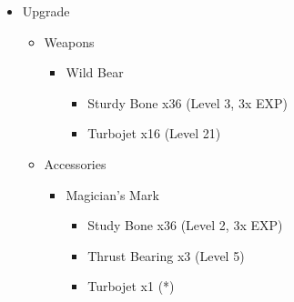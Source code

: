 \begin{upgrade}
\begin{itemize}
    \item Upgrade
    \begin{itemize}
        \item Weapons
        \begin{itemize}
            \item Wild Bear
            \begin{itemize}
                \item Sturdy Bone x36 (Level 3, 3x EXP)
                \item Turbojet x16 (Level 21)
            \end{itemize}
        \end{itemize}
        \item Accessories
        \begin{itemize}
            \item Magician's Mark
            \begin{itemize}
                \item Study Bone x36 (Level 2, 3x EXP)
                \item Thrust Bearing x3 (Level 5)
                \item Turbojet x1 (*)
            \end{itemize}
        \end{itemize}
    \end{itemize}
\end{itemize}
\end{upgrade}
